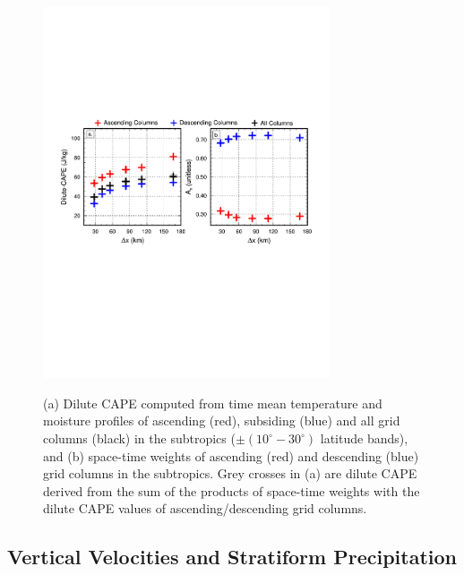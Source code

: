 \documentclass[times]{qjrms4}
\begin{document}
\begin{figure}
\begin{center}
\noindent\includegraphics[width=20pc,angle=0]{figs/temp_cape-subtropics.pdf}\\
\end{center}
\caption{(a) Dilute CAPE computed from time mean temperature and moisture profiles of ascending (red), subsiding (blue) and all grid columns (black) in the subtropics ($\pm \left(10^{\circ}-30^{\circ} \right)$ latitude bands), and (b) space-time weights of ascending (red) and descending (blue) grid columns in the subtropics. Grey crosses in (a) are dilute CAPE derived from the sum of the products of space-time weights with the dilute CAPE values of ascending/descending grid columns.}
\label{fig:cape-subt}
\end{figure}

\subsection{Vertical Velocities and Stratiform Precipitation}
\end{document}
